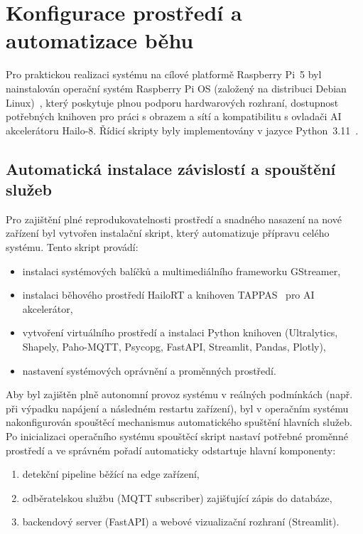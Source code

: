 \documentclass[male,czech,api_bc]{kitheses}
\begin{document}
\section{Konfigurace prostředí a automatizace běhu}
Pro praktickou realizaci systému na cílové platformě Raspberry Pi~5 byl nainstalován operační systém Raspberry Pi OS (založený na distribuci Debian Linux)~\cite{raspberrypi_docs_2024}, který poskytuje plnou podporu hardwarových rozhraní, dostupnost potřebných knihoven pro práci s obrazem a sítí a kompatibilitu s ovladači AI akcelerátoru Hailo-8. Řídicí skripty byly implementovány v jazyce Python~3.11~\cite{python_docs_313_2025}.

\subsection{Automatická instalace závislostí a spouštění služeb}
Pro zajištění plné reprodukovatelnosti prostředí a snadného nasazení na nové zařízení byl vytvořen instalační skript, který automatizuje přípravu celého systému. Tento skript provádí:
\begin{itemize}
    \item instalaci systémových balíčků a multimediálního frameworku GStreamer,
    \item instalaci běhového prostředí HailoRT a knihoven TAPPAS~\cite{tappas_user_guide_331} pro AI akcelerátor,
    \item vytvoření virtuálního prostředí a instalaci Python knihoven (Ultralytics, Shapely, Paho-MQTT, Psycopg, FastAPI, Streamlit, Pandas, Plotly),
    \item nastavení systémových oprávnění a proměnných prostředí.
\end{itemize}

Aby byl zajištěn plně autonomní provoz systému v reálných podmínkách (např. při výpadku napájení a následném restartu zařízení), byl v operačním systému nakonfigurován spouštěcí mechanismus automatického spuštění hlavních služeb. Po inicializaci operačního systému spouštěcí skript nastaví potřebné proměnné prostředí a ve správném pořadí automaticky odstartuje hlavní komponenty:
\begin{enumerate}
    \item detekční pipeline běžící na edge zařízení,
    \item odběratelskou službu (MQTT subscriber) zajišťující zápis do databáze,
    \item backendový server (FastAPI) a webové vizualizační rozhraní (Streamlit).
\end{enumerate}
\end{document}
